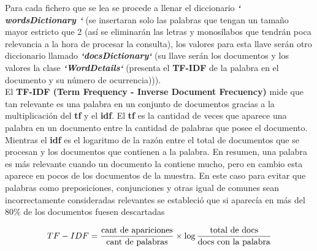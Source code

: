 \documentclass{article}
\begin{document}
\begin{flushleft}
{Para cada fichero que se lea se procede a llenar el diccionario \textbf{\textit{` wordsDictionary `}} (se 
insertaran solo las palabras que tengan un tamaño mayor estricto que 2 (así se eliminarán las letras y monosílabos que tendrán poca relevancia a la hora de procesar la consulta), los valores para esta llave serán otro diccionario llamado \textbf{\textit{`docsDictionary`}} (su llave serán los documentos y los valores la clase \textbf{\textit{`WordDetails`}} (presenta el  \textbf{TF-IDF} de la palabra en el documento y su número de ocurrencia))).\linebreak \\

El  \textbf{TF-IDF (Term Frequency - Inverse Document Frecuency)} mide que tan relevante es 
una palabra en un conjunto de documentos gracias a la multiplicación del  \textbf{tf} y el  \textbf{idf}. El  \textbf{tf } es la cantidad de veces que aparece una palabra en un documento entre la cantidad de 
palabras que posee el documento. Mientras el  \textbf{idf} es el logaritmo de la razón entre el total 
de documentos que se procesan y los documentos que contienen a la palabra. En 
resumen, una palabra es más relevante cuando un documento la contiene mucho, pero 
en cambio esta aparece en pocos de los documentos de la muestra. En este caso para 
evitar que palabras como preposiciones, conjunciones y otras igual de comunes sean 
incorrectamente consideradas relevantes se estableció que si aparecía en más del 80\% 
de los documentos fuesen descartadas}
\end{flushleft}

\begin{center}
\begin{equation}
TF-IDF = \frac{\textup{cant de apariciones}}{\textup{cant de palabras}}\times\log\frac{\textup{total de docs}}{\textup{docs con la palabra}}
\end{equation}
\end{center}
\end{document}
